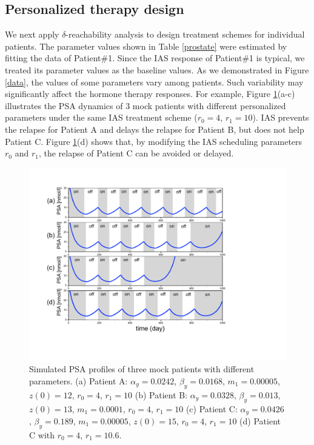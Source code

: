 \subsection{Personalized therapy design}
We next apply $\delta$-reachability analysis to design treatment schemes for individual patients. The parameter values shown in Table \ref{prostate} were estimated by fitting the data of Patient\#1. Since the IAS response of Patient\#1 is typical, we treated its parameter values as the baseline values. As we demonstrated in Figure \ref{data}, the values of some parameters vary among patients. Such variability may significantly affect the hormone therapy responses. 
For example, Figure \ref{patients}(a-c) illustrates the PSA dynamics of $3$ mock patients with different personalized parameters under the same IAS treatment scheme ($r_0=4$, $r_1=10$). IAS prevents the relapse for Patient A and delays the relapse for Patient B, but does not help Patient C. Figure \ref{patients}(d) shows that, by modifying the IAS scheduling parameters $r_0$ and $r_1$, the relapse of Patient C can be avoided or delayed. 

\begin{figure}[htb]
\centering
\includegraphics[scale=0.43]{fig-mock}
\caption{Simulated PSA profiles of three mock patients with different parameters. (a) Patient A: $\alpha_y=0.0242$, $\beta_y=0.0168$, $m_1=0.00005$, $z(0)=12$, $r_0=4$, $r_1=10$ (b) Patient B: $\alpha_y=0.0328$, $\beta_y=0.013$, $z(0)=13$, $m_1=0.0001$, $r_0=4$, $r_1=10$ (c) Patient C: $\alpha_y=0.0426$, $\beta_y=0.189$, $m_1=0.00005$, $z(0)=15$, $r_0=4$, $r_1=10$ (d) Patient C with $r_0=4$, $r_1=10.6$.}
\label{patients}
 \vspace{-0.5cm}
\end{figure}

